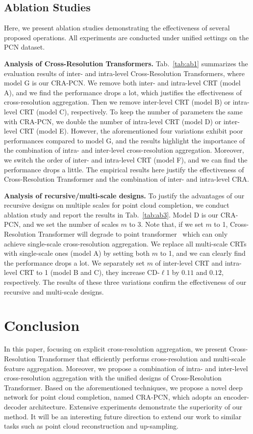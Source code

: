 \documentclass[letterpaper]{article} %
\begin{document}
{\subsection{Ablation Studies} \label{sec:ablation}
Here, we present ablation studies demonstrating the effectiveness of several proposed operations. 
All experiments are conducted under unified settings on the PCN dataset.

{\bf  Analysis of Cross-Resolution Transformers.} 
Tab.~\ref{tab:ab1} summarizes the evaluation results of inter- and intra-level Cross-Resolution Transformers, where model G is our CRA-PCN. 
We remove both inter- and intra-level CRT (model A), and we find the performance drops a lot, which justifies the effectiveness of cross-resolution aggregation.
Then we remove inter-level CRT (model B) or intra-level CRT (model C), respectively.
To keep the number of parameters the same with CRA-PCN, we double the number of intra-level CRT (model D) or inter-level CRT (model E). 
However, the aforementioned four variations exhibit poor performances compared to model G, and the results highlight the importance of the combination of intra- and inter-level cross-resolution aggregation. 
Moreover, we switch the order of inter- and intra-level CRT (model F), and we can find the performance drops a little.  
The empirical results here justify the effectiveness of Cross-Resolution Transformer and the combination of inter- and intra-level CRA.

{\bf Analysis of recursive/multi-scale designs.} 
To justify the advantages of our recursive  designs on multiple scales  for point cloud completion, we conduct ablation study and report the results in Tab.~\ref{tab:ab3}. 
Model D is our CRA-PCN, and we set the number of scales $m$ to 3. 
Note that, if we set $m$ to 1, Cross-Resolution Transformer will degrade to point transformer~\cite{zhao2021point} which can only achieve single-scale cross-resolution  aggregation. 
We replace all multi-scale CRTs with single-scale ones (model A) by setting both $m$ to 1, and we can clearly find the performance drops a lot. 
We separately set $m$ of inter-level CRT and intra-level CRT to 1 (model B and  C), they increase CD-$\ell$1 by $0.11$ and $0.12$, respectively.    
The results of these three variations confirm the effectiveness of our recursive and multi-scale designs.

\section{Conclusion}
In this paper, focusing on explicit cross-resolution aggregation, we present Cross-Resolution Transformer that efficiently performs cross-resolution and  multi-scale feature aggregation. 
Moreover, we propose a combination of intra- and inter-level cross-resolution aggregation with the unified designs of Cross-Resolution Transformer.
Based on the aforementioned techniques, we propose a novel deep network for point cloud completion, named CRA-PCN, which adopts an encoder-decoder architecture.
Extensive experiments demonstrate the superiority of our method.
It will be an interesting future direction to extend our work to similar tasks such as point cloud reconstruction and up-sampling. 


}
\end{document}
